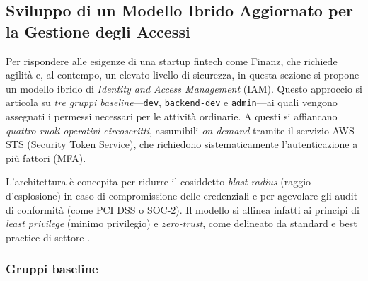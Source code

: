 \subsection{Sviluppo di un Modello Ibrido Aggiornato per la Gestione degli Accessi}
\label{subsec:modello_ibrido_aggiornato_iam}
Per rispondere alle esigenze di una startup fintech come Finanz, che richiede agilità e, al contempo, un elevato livello di sicurezza, in questa sezione si propone un modello ibrido di \emph{Identity and Access Management} (IAM). Questo approccio si articola su \emph{tre gruppi baseline}—\texttt{dev}, \texttt{backend-dev} e \texttt{admin}—ai quali vengono assegnati i permessi necessari per le attività ordinarie. A questi si affiancano \emph{quattro ruoli operativi circoscritti}, assumibili \emph{on-demand} tramite il servizio AWS STS (Security Token Service), che richiedono sistematicamente l'autenticazione a più fattori (MFA).

L'architettura è concepita per ridurre il cosiddetto \emph{blast-radius} (raggio d'esplosione) in caso di compromissione delle credenziali e per agevolare gli audit di conformità (come PCI DSS o SOC-2). Il modello si allinea infatti ai principi di \emph{least privilege} (minimo privilegio) e \emph{zero-trust}, come delineato da standard e best practice di settore \cite{NIST_ZTA,NIST_SP80063,PCI_DSS,DatadogLeastPrivilege}.

\subsubsection{Gruppi baseline}
\label{subsubsec:gruppi_base_iam}

